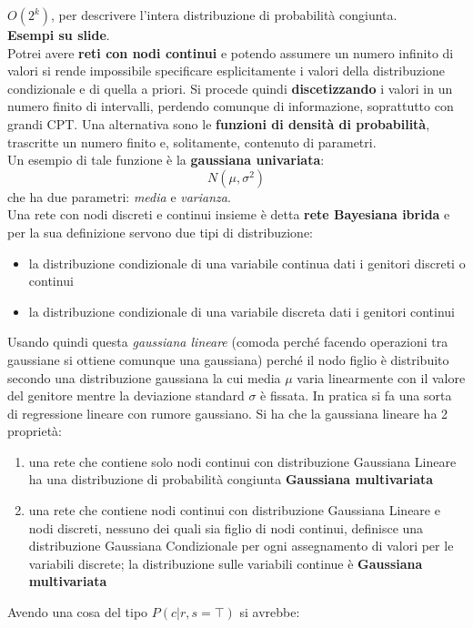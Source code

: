 \documentclass[a4paper,12pt, oneside]{book}
\begin{document}
$O(2^k)$, per descrivere l'intera distribuzione di probabilità congiunta.\\
\textbf{Esempi su slide}.\\
Potrei avere \textbf{reti con nodi continui} e potendo assumere un numero
infinito di valori si rende impossibile specificare esplicitamente i valori della
distribuzione condizionale e di quella a priori. Si procede quindi
\textbf{discetizzando} i valori in un numero finito di intervalli, perdendo
comunque di informazione, soprattutto con grandi CPT. Una alternativa sono le
\textbf{funzioni di densità di probabilità}, trascritte un numero finito e,
solitamente, contenuto di parametri.\\
Un esempio di tale funzione è la \textbf{gaussiana univariata}:
\[N(\mu,\sigma^2)\]
che ha due parametri: \textit{media} e \textit{varianza}.\\
Una rete con nodi discreti e continui insieme è detta \textbf{rete Bayesiana
  ibrida} e per la sua definizione servono due tipi di distribuzione:
\begin{itemize}
  \item la distribuzione condizionale di una variabile continua dati i genitori
  discreti o continui
  \item la distribuzione condizionale di una variabile discreta dati i genitori
  continui 
\end{itemize}
Usando quindi questa \textit{gaussiana lineare} (comoda perché facendo
operazioni tra gaussiane si ottiene comunque una gaussiana) perché il nodo
figlio è 
distribuito secondo una distribuzione gaussiana la cui media $\mu$ varia
linearmente con il valore del genitore mentre la deviazione standard $\sigma$ è
fissata. In pratica si fa una sorta di regressione lineare con rumore
gaussiano. Si ha che la gaussiana lineare ha 2 proprietà:
\begin{enumerate}
  \item una rete che contiene solo nodi continui con distribuzione Gaussiana
  Lineare ha una 
  distribuzione di probabilità congiunta \textbf{Gaussiana multivariata}
  \item una rete che contiene nodi continui con distribuzione Gaussiana Lineare
  e nodi discreti, 
  nessuno dei quali sia figlio di nodi continui, definisce una distribuzione
  Gaussiana Condizionale 
  per ogni assegnamento di valori per le variabili discrete; la distribuzione
  sulle variabili continue 
  è \textbf{Gaussiana multivariata}
\end{enumerate}
Avendo una cosa del tipo $P(c|r,s=\top)$ si avrebbe:
\end{document}
